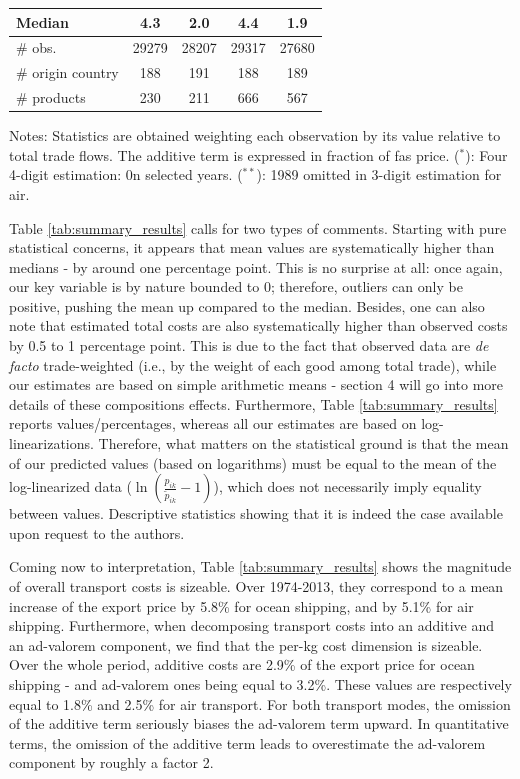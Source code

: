 \documentclass[a4paper,11pt]{article}
\begin{document}
\begin{table}[htbp]
{\begin{center}
\begin{tabular}{l|cc|cc}
        Median & 4.3 & 2.0 & 4.4& 1.9 \\ \hline
        \# obs. & 29279 & 28207 & 29317 & 27680 \\
    \# origin country & 188 & 191 & 188 & 189 \\
    \# products & 230 & 211 & 666 & 567 \\  \hline \hline
  \end{tabular}
    \end{center}}
\parbox[l]{10cm}{\tiny{Notes: Statistics are obtained weighting each observation by its value relative to total trade flows. The additive term is expressed in fraction of fas price. ($^\ast$): Four 4-digit estimation: 0n selected years. ($^{\ast \ast}$): 1989 omitted in 3-digit estimation for air.}}
\end{table}%


Table \ref{tab:summary_results} calls for two types of comments. Starting with pure statistical concerns, it appears that mean values are systematically higher than medians - by around one percentage point. This is no surprise at all: once again, our key variable is by nature bounded to 0; therefore, outliers can only be positive, pushing the mean up compared to the median. Besides, one can also note that estimated total costs are also systematically higher than observed costs by 0.5 to 1 percentage point. This is due to the fact that observed data are \emph{de facto} trade-weighted (i.e., by the weight of each good among total trade), while our estimates are based on simple arithmetic means - section 4 will go into more details of these compositions effects. Furthermore, Table \ref{tab:summary_results} reports values/percentages, whereas all our estimates are based on log-linearizations. Therefore, what matters on the statistical ground is that the mean of our predicted values (based on logarithms) must be equal to the mean of the log-linearized data ($\ln\left(\frac{p_{ik}}{\widetilde{p}_{ik}}-1 \right)$), which does not necessarily imply equality between values. Descriptive statistics showing that it is indeed the case available upon request to the authors.

Coming now to interpretation, Table \ref{tab:summary_results} shows the magnitude of overall transport costs is sizeable. Over 1974-2013, they correspond to a mean increase of the export price by 5.8\% for ocean shipping, and by 5.1\% for air shipping. Furthermore, when decomposing transport costs into an additive and an ad-valorem component, we find that the per-kg cost dimension is sizeable. Over the whole period, additive costs are 2.9\% of the export price for ocean shipping  - and ad-valorem ones being equal to 3.2\%. These values are respectively equal to 1.8\% and 2.5\% for air transport. For both transport modes, the omission of the additive term seriously biases the ad-valorem term upward. In quantitative terms, the omission of the additive term leads to overestimate the ad-valorem component by roughly a factor 2.
\end{document}
